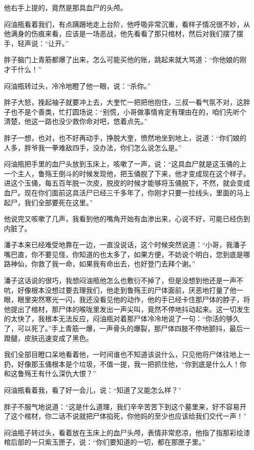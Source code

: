 他右手上提的，竟然是那具血尸的头颅。

闷油瓶看着我们，有点蹒跚地走上台阶，他呼吸非常沉重，看样子情况很不妙，从他满身的伤痕来看，应该是一场恶战，他先看看了那只棺材，然后对我们摆了摆手，轻声说：“让开。”

胖子脑门上青筋都爆了出来，怎么可能买他的账，跳起来就大骂道：“你他娘的刚才干什么！”

闷油瓶转过头，冷冷地瞪了他一眼，说：“杀你。”

胖子大怒，挽起袖子就要冲上去，大奎忙一把把他抱住，三叔一看气氛不对，这胖子也不是个善类，忙打圆场说：“别慌，小哥做事情肯定有理由在的，咱们先听个清楚，他这一路也没少救你命对吧，悠着点先。”

胖子一想，也对，也不好再动手，挣脱大奎，愤然地坐到地上，说道：“你们娘的人多，胖爷我一拳难敌四手，没办法，你们怎么说怎么是。”

闷油瓶把手里的血尸头放到玉床上，咳嗽了一声，说：“这具血尸就是这玉俑的上一个主人，鲁殇王倒斗的时候发现他，把玉俑脱了下来，他才变成现在这个样子。进这个玉俑，每五百年脱一次皮，脱皮的时候才能够将玉俑脱下，不然，就会变成血尸。现在你们面前这具活尸已经三千多年了，你刚才只要一拉线头，里面的马上起尸，我们全部要死在这里。”

他说完又咳嗽了几声，我看到他的嘴角开始有血渗出来，心说不好，可能已经伤到内脏了。

潘子本来已经难受地靠在一边，一直没说话，这个时候突然说道：“小哥，我潘子嘴巴直，你不要见怪，你知道的也太多了，如果方便，不妨说个明白，您到底是哪路神仙，你救了我一命，如果我有命出去，也好登门去拜个谢。”

潘子这话说的很巧，我想闷油瓶他怎么也敷衍不掉了，但是没想到他还是一声不吭，好像根本没想过要去理我们，他走到鲁殇王的尸体面前，厌恶地打量了他一眼，眼里突然寒光一闪，我还没看见他的动作，他的手已经卡住那尸体的脖子，将他提出了棺材，那尸体的喉咙里发出一声尖叫，竟然不停地抖动起来。这一切发生的太快了，我根本无法反应，闷油瓶对着那尸体冷冷地说了一句：“你活的够久了，可以死了。”手上青筋一爆，一声骨头的爆裂，那尸体四肢不停地颤抖，最后一蹬腿，皮肤迅速变成了黑色。

我们全部目瞪口呆地看着他，一时间谁也不知道该说什么，只见他将尸体往地上一扔，好像那玉俑根本是个垃圾，不值一提，我一把抓住他，“你到底是什么人！你和这鲁殇王有什么深仇大恨？”

闷油瓶看着我，看了好一会儿，说：“知道了又能怎么样？”

胖子不服气地说道：“这是什么道理，我们辛辛苦苦下到这个墓里来，好不容易开了这个棺材，你二话不说就把尸体掐死，你他妈的至少也应该给我们交代一声！”

闷油瓶子转过头，看着放在玉床上的血尸头颅，表情非常悲凉，他指了指那彩绘漆棺后部的一只紫玉匣子，说：“你们要知道的一切，都在那匣子里。”

